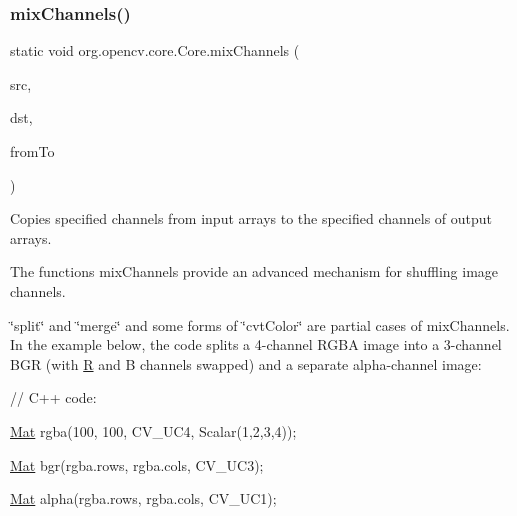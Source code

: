 \subsubsection{\texorpdfstring{mix\+Channels()}{mixChannels()}}
{\footnotesize\ttfamily static void org.\+opencv.\+core.\+Core.\+mix\+Channels (\begin{DoxyParamCaption}\item[{List$<$ \mbox{\hyperlink{classorg_1_1opencv_1_1core_1_1_mat}{Mat}} $>$}]{src,  }\item[{List$<$ \mbox{\hyperlink{classorg_1_1opencv_1_1core_1_1_mat}{Mat}} $>$}]{dst,  }\item[{\mbox{\hyperlink{classorg_1_1opencv_1_1core_1_1_mat_of_int}{Mat\+Of\+Int}}}]{from\+To }\end{DoxyParamCaption})\hspace{0.3cm}{\ttfamily [static]}}

Copies specified channels from input arrays to the specified channels of output arrays.

The functions {\ttfamily mix\+Channels} provide an advanced mechanism for shuffling image channels.

\char`\"{}split\char`\"{} and \char`\"{}merge\char`\"{} and some forms of \char`\"{}cvt\+Color\char`\"{} are partial cases of {\ttfamily mix\+Channels}. In the example below, the code splits a 4-\/channel R\+G\+BA image into a 3-\/channel B\+GR (with \mbox{\hyperlink{classorg_1_1opencv_1_1_r}{R}} and B channels swapped) and a separate alpha-\/channel image\+: {\ttfamily }

{\ttfamily }

{\ttfamily }

{\ttfamily // C++ code\+:}

{\ttfamily }

{\ttfamily }

{\ttfamily \mbox{\hyperlink{classorg_1_1opencv_1_1core_1_1_mat}{Mat}} rgba(100, 100, C\+V\+\_\+U\+C4, Scalar(1,2,3,4));}

{\ttfamily }

{\ttfamily }

{\ttfamily \mbox{\hyperlink{classorg_1_1opencv_1_1core_1_1_mat}{Mat}} bgr(rgba.\+rows, rgba.\+cols, C\+V\+\_\+U\+C3);}

{\ttfamily }

{\ttfamily }

{\ttfamily \mbox{\hyperlink{classorg_1_1opencv_1_1core_1_1_mat}{Mat}} alpha(rgba.\+rows, rgba.\+cols, C\+V\+\_\+U\+C1);}

